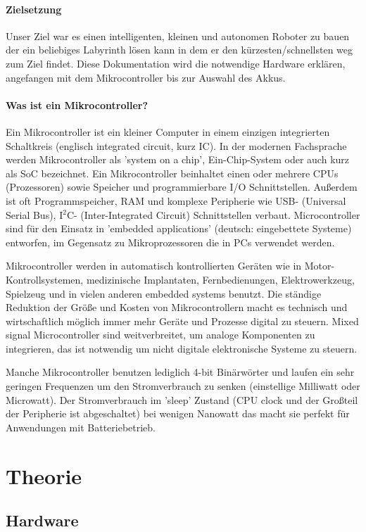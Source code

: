 \documentclass[12pt]{article}
\begin{document}
\paragraph{Zielsetzung} Unser Ziel war es einen intelligenten, kleinen und autonomen Roboter zu bauen der ein beliebiges Labyrinth lösen kann in dem er den kürzesten/schnellsten weg zum Ziel findet. Diese Dokumentation wird die notwendige Hardware erklären, angefangen mit dem Mikrocontroller bis zur Auswahl des Akkus. 

\paragraph{Was ist ein Mikrocontroller?} Ein Mikrocontroller ist ein kleiner Computer in einem einzigen integrierten Schaltkreis (englisch integrated circuit, kurz IC). In der modernen Fachsprache werden Mikrocontroller als 'system on a chip', Ein-Chip-System oder auch kurz als SoC bezeichnet. Ein Mikrocontroller beinhaltet einen oder mehrere CPUs (Prozessoren) sowie Speicher und programmierbare I/O Schnittstellen. Außerdem ist oft Programmspeicher, RAM und komplexe Peripherie wie USB- (Universal Serial Bus), I$^2$C- (Inter-Integrated Circuit) Schnittstellen verbaut. Microcontroller sind für den Einsatz in 'embedded applications' (deutsch: eingebettete Systeme) entworfen, im Gegensatz zu Mikroprozessoren die in PCs verwendet werden.

Mikrocontroller werden in automatisch kontrollierten Geräten wie in Motor\hyp Kontrollsystemen, medizinische Implantaten, Fernbedienungen, Elektrowerkzeug, Spielzeug und in vielen anderen embedded systems benutzt. Die ständige Reduktion der Größe und Kosten von Mikrocontrollern macht es technisch und wirtschaftlich möglich immer mehr Geräte und Prozesse digital zu steuern. Mixed signal Microcontroller sind weitverbreitet, um analoge Komponenten zu integrieren, das ist notwendig um nicht digitale elektronische Systeme zu steuern.

Manche Mikrocontroller benutzen lediglich 4-bit Binärwörter und laufen ein sehr geringen Frequenzen um den Stromverbrauch zu senken (einstellige Milliwatt oder Microwatt). Der Stromverbrauch im 'sleep' Zustand (CPU clock und der Großteil der Peripherie ist abgeschaltet) bei wenigen Nanowatt das macht sie perfekt für Anwendungen mit Batteriebetrieb.
\section{Theorie}
\subsection{Hardware}
\end{document}
